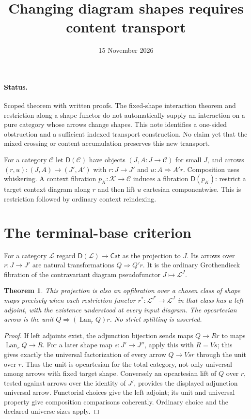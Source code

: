\documentclass[11pt]{article}
\title{Changing diagram shapes requires content transport}
\date{15 November 2026}
\newtheorem{theorem}{Theorem}\newtheorem{proposition}{Proposition}
\begin{document}
\maketitle
\paragraph{Status.} Scoped theorem with written proofs. The fixed-shape interaction theorem and restriction along a shape functor do not automatically supply an interaction on a pure category whose arrows change shapes. This note identifies a one-sided obstruction and a sufficient indexed transport construction. No claim yet that the mixed crossing or content accumulation preserves this new transport.

For a category $\mathcal C$ let $\mathsf D(\mathcal C)$ have objects $(J,A:J\to\mathcal C)$ for small $J$, and arrows $(r,u):(J,A)\to(J',A')$ with $r:J\to J'$ and $u:A\Rightarrow A'r$. Composition uses whiskering. A context fibration $p_K:\mathcal K\to\mathcal C$ induces a fibration $\mathsf D(p_K)$: restrict a target context diagram along $r$ and then lift $u$ cartesian componentwise. This is restriction followed by ordinary context reindexing.

\section{The terminal-base criterion}
For a category $\mathcal L$ regard $\mathsf D(\mathcal L)\to\mathsf{Cat}$ as the projection to $J$. Its arrows over $r:J\to J'$ are natural transformations $Q\Rightarrow Q'r$. It is the ordinary Grothendieck fibration of the contravariant diagram pseudofunctor $J\mapsto\mathcal L^J$.

\begin{theorem}
This projection is also an opfibration over a chosen class of shape maps precisely when each restriction functor $r^*:\mathcal L^{J'}\to\mathcal L^J$ in that class has a left adjoint, with the existence understood at every input diagram. The opcartesian arrow is the unit $Q\Rightarrow(\operatorname{Lan}_r Q)r$. No strict splitting is asserted.
\end{theorem}
\begin{proof}
If left adjoints exist, the adjunction bijection sends maps $Q\to Rr$ to maps $\operatorname{Lan}_rQ\to R$. For a later shape map $s:J'\to J''$, apply this with $R=Vs$; this gives exactly the universal factorization of every arrow $Q\to Vsr$ through the unit over $r$. Thus the unit is opcartesian for the total category, not only universal among arrows with fixed target shape. Conversely an opcartesian lift of $Q$ over $r$, tested against arrows over the identity of $J'$, provides the displayed adjunction universal arrow. Functorial choices give the left adjoint; its unit and universal property give composition comparisons coherently. Ordinary choice and the declared universe sizes apply.
\end{proof}
\end{document}
